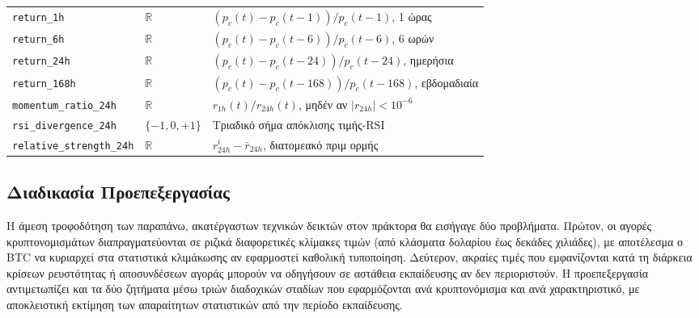 \begin{table}[t]
\begin{tabular}{@{}lll@{}}
    \texttt{return\_1h}      & $\mathbb{R}$ & $(p_c(t) - p_c(t{-}1))/p_c(t{-}1)$, 1 ώρας \\
    \texttt{return\_6h}      & $\mathbb{R}$ & $(p_c(t) - p_c(t{-}6))/p_c(t{-}6)$, 6 ωρών \\
    \texttt{return\_24h}     & $\mathbb{R}$ & $(p_c(t) - p_c(t{-}24))/p_c(t{-}24)$, ημερήσια \\
    \texttt{return\_168h}    & $\mathbb{R}$ & $(p_c(t) - p_c(t{-}168))/p_c(t{-}168)$, εβδομαδιαία \\
    \texttt{momentum\_ratio\_24h}   & $\mathbb{R}$        & $r_{1h}(t)/r_{24h}(t)$, μηδέν αν $|r_{24h}| < 10^{-6}$ \\
    \texttt{rsi\_divergence\_24h}   & $\{-1,0,+1\}$       & Τριαδικό σήμα απόκλισης τιμής-RSI \\
    \texttt{relative\_strength\_24h}& $\mathbb{R}$        & $r^{i}_{24h} - \bar{r}_{24h}$, διατομεακό πριμ ορμής \\
    \bottomrule
  \end{tabular}
\end{table}

\subsection{Διαδικασία Προεπεξεργασίας}
\label{sec:preprocessing}

Η άμεση τροφοδότηση των παραπάνω, ακατέργαστων τεχνικών δεικτών στον πράκτορα θα εισήγαγε
δύο προβλήματα. Πρώτον, οι αγορές κρυπτονομισμάτων διαπραγματεύονται σε
ριζικά διαφορετικές κλίμακες τιμών (από κλάσματα δολαρίου έως δεκάδες
χιλιάδες), με αποτέλεσμα ο BTC να κυριαρχεί στα στατιστικά κλιμάκωσης αν
εφαρμοστεί καθολική τυποποίηση. Δεύτερον, ακραίες τιμές που εμφανίζονται κατά
τη διάρκεια κρίσεων ρευστότητας ή αποσυνδέσεων αγοράς μπορούν να οδηγήσουν σε
αστάθεια εκπαίδευσης αν δεν περιοριστούν. Η προεπεξεργασία
αντιμετωπίζει και τα δύο ζητήματα μέσω τριών διαδοχικών σταδίων που
εφαρμόζονται ανά κρυπτονόμισμα και ανά χαρακτηριστικό, με αποκλειστική
εκτίμηση των απαραίτητων στατιστικών από την περίοδο εκπαίδευσης.

